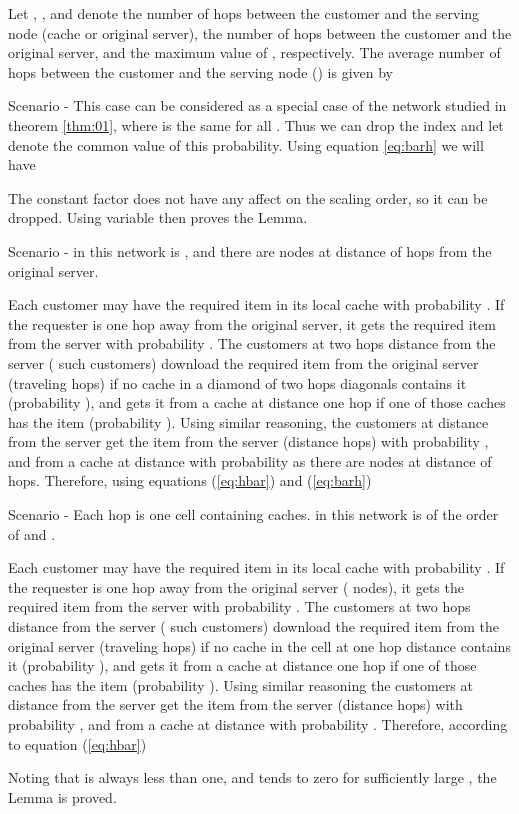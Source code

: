 \documentclass[journal]{IEEEtran}
\theoremstyle{plain}
\theoremstyle{remark}
\begin{document}
\begin{IEEEproof}
Let , , and  denote the number of hops between the customer and the serving node (cache or original server), the number of hops between the customer and the original server, and the maximum value of , respectively. The average number of hops between the customer and the serving node () is given by



Scenario - This case can be considered as a special case of the network studied in theorem \ref{thm:01}, where  is the same for all . Thus we can drop the index  and let  denote the common value of this probability. Using equation \ref{eq:barh} we will have



The constant factor  does not have any affect on the scaling order, so it can be dropped. Using variable  then proves the Lemma.



Scenario  -  in this network is , and there are  nodes at distance of  hops from the original server. 


Each customer may have the required item in its local cache with probability . If the requester is one hop away from the original server, it gets the required item from the server with probability . The customers at two hops distance from the server ( such customers) download the required item from the original server (traveling  hops) if no cache in a diamond of two hops diagonals contains it (probability ), and gets it from a cache at distance one hop if one of those caches has the item (probability ). Using similar reasoning, the customers at distance  from the server get the item from the server (distance  hops) with probability , and from a cache at distance  with probability  as there are  nodes at distance of  hops. Therefore, using equations (\ref{eq:hbar}) and (\ref{eq:barh})





Scenario  -  Each hop is one cell containing  caches.  in this network is of the order of  and
.


Each customer may have the required item in its local cache with probability .  If the requester is one hop away from the original server ( nodes), it gets the required item from the server with probability . The customers at two hops distance from the server ( such customers) download the required item from the original server (traveling  hops) if no cache in the cell at one hop distance contains it (probability ), and gets it from a cache at distance one hop if one of those caches has the item (probability ). Using similar reasoning the customers at distance  from the server get the item from the server (distance  hops) with probability , and from a cache at distance  with probability . Therefore, according to equation (\ref{eq:hbar})




	Noting that  is always less than one, and tends to zero for sufficiently large , the Lemma is proved.
	\end{IEEEproof}
	
\end{document}
